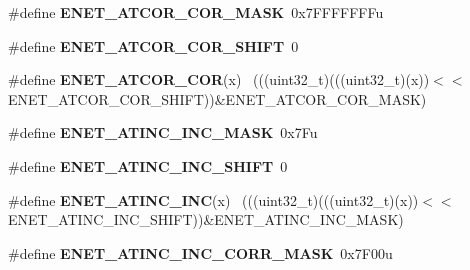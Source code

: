 \begin{DoxyCompactItemize}
\item 
\hypertarget{group___e_n_e_t___register___masks_gacbd6f1547546f95562a646e40ab095d3}{}\#define {\bfseries E\+N\+E\+T\+\_\+\+A\+T\+C\+O\+R\+\_\+\+C\+O\+R\+\_\+\+M\+A\+S\+K}~0x7\+F\+F\+F\+F\+F\+F\+Fu\label{group___e_n_e_t___register___masks_gacbd6f1547546f95562a646e40ab095d3}

\item 
\hypertarget{group___e_n_e_t___register___masks_ga5b25c79c73597f4700107d56a1cdcd91}{}\#define {\bfseries E\+N\+E\+T\+\_\+\+A\+T\+C\+O\+R\+\_\+\+C\+O\+R\+\_\+\+S\+H\+I\+F\+T}~0\label{group___e_n_e_t___register___masks_ga5b25c79c73597f4700107d56a1cdcd91}

\item 
\hypertarget{group___e_n_e_t___register___masks_ga0bd6f04fe28b106fd27634bdf79d16cd}{}\#define {\bfseries E\+N\+E\+T\+\_\+\+A\+T\+C\+O\+R\+\_\+\+C\+O\+R}(x)                                            ~(((uint32\+\_\+t)(((uint32\+\_\+t)(x))$<$$<$E\+N\+E\+T\+\_\+\+A\+T\+C\+O\+R\+\_\+\+C\+O\+R\+\_\+\+S\+H\+I\+F\+T))\&E\+N\+E\+T\+\_\+\+A\+T\+C\+O\+R\+\_\+\+C\+O\+R\+\_\+\+M\+A\+S\+K)\label{group___e_n_e_t___register___masks_ga0bd6f04fe28b106fd27634bdf79d16cd}

\item 
\hypertarget{group___e_n_e_t___register___masks_ga658c4082b327e6291ea190f5d2e7b8b6}{}\#define {\bfseries E\+N\+E\+T\+\_\+\+A\+T\+I\+N\+C\+\_\+\+I\+N\+C\+\_\+\+M\+A\+S\+K}~0x7\+Fu\label{group___e_n_e_t___register___masks_ga658c4082b327e6291ea190f5d2e7b8b6}

\item 
\hypertarget{group___e_n_e_t___register___masks_ga876ed9c5bafbfc5e251c600dc3b1af58}{}\#define {\bfseries E\+N\+E\+T\+\_\+\+A\+T\+I\+N\+C\+\_\+\+I\+N\+C\+\_\+\+S\+H\+I\+F\+T}~0\label{group___e_n_e_t___register___masks_ga876ed9c5bafbfc5e251c600dc3b1af58}

\item 
\hypertarget{group___e_n_e_t___register___masks_ga4f64106e2d0c1cc7a11814149355dd36}{}\#define {\bfseries E\+N\+E\+T\+\_\+\+A\+T\+I\+N\+C\+\_\+\+I\+N\+C}(x)                                            ~(((uint32\+\_\+t)(((uint32\+\_\+t)(x))$<$$<$E\+N\+E\+T\+\_\+\+A\+T\+I\+N\+C\+\_\+\+I\+N\+C\+\_\+\+S\+H\+I\+F\+T))\&E\+N\+E\+T\+\_\+\+A\+T\+I\+N\+C\+\_\+\+I\+N\+C\+\_\+\+M\+A\+S\+K)\label{group___e_n_e_t___register___masks_ga4f64106e2d0c1cc7a11814149355dd36}

\item 
\hypertarget{group___e_n_e_t___register___masks_gad06628842cadf9dd5423d8bc31c32745}{}\#define {\bfseries E\+N\+E\+T\+\_\+\+A\+T\+I\+N\+C\+\_\+\+I\+N\+C\+\_\+\+C\+O\+R\+R\+\_\+\+M\+A\+S\+K}~0x7\+F00u\label{group___e_n_e_t___register___masks_gad06628842cadf9dd5423d8bc31c32745}


\end{DoxyCompactItemize}
